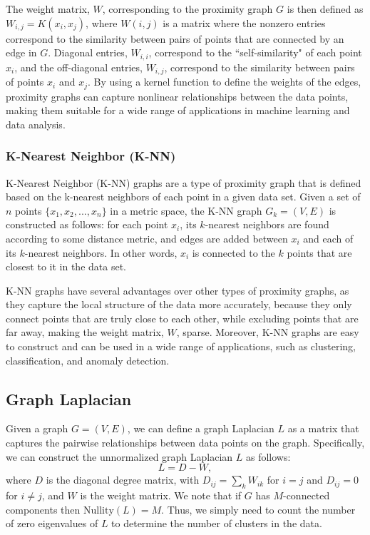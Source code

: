 \documentclass[12pt]{amsart}
\begin{document}
The weight matrix, $W$, corresponding to the proximity graph $G$ is then defined as $W_{i,j} = K(x_i,x_j)$, where $W(i,j)$ is a matrix where the nonzero entries correspond to the similarity between pairs of points that are connected by an edge in $G$. Diagonal entries, $W_{i,i}$, correspond to the ``self-similarity" of each point $x_i$, and the off-diagonal entries, $W_{i,j}$, correspond to the similarity between pairs of points $x_i$ and $x_j$. By using a kernel function to define the weights of the edges, proximity graphs can capture nonlinear relationships between the data points, making them suitable for a wide range of applications in machine learning and data analysis.
\subsubsection{K-Nearest Neighbor (K-NN)}
K-Nearest Neighbor (K-NN) graphs are a type of proximity graph that is defined based on the k-nearest neighbors of each point in a given data set. Given a set of $n$ points $\{x_1, x_2, ..., x_n\}$ in a metric space, the K-NN graph $G_k = (V, E)$ is constructed as follows: for each point $x_i$, its $k$-nearest neighbors are found according to some distance metric, and edges are added between $x_i$ and each of its $k$-nearest neighbors. In other words, $x_i$ is connected to the $k$ points that are closest to it in the data set.

K-NN graphs have several advantages over other types of proximity graphs, as they capture the local structure of the data more accurately, because they only connect points that are truly close to each other, while excluding points that are far away, making the weight matrix, $W$, sparse. Moreover, K-NN graphs are easy to construct and can be used in a wide range of applications, such as clustering, classification, and anomaly detection.

\subsection{Graph Laplacian}
Given a graph $G = (V, E)$, we can define a graph Laplacian $L$ as a matrix that captures the pairwise relationships between data points on the graph. Specifically, we can construct the unnormalized graph Laplacian $L$ as follows:
$$ L = D - W, $$
where $D$ is the diagonal degree matrix, with $D_{ij} = \sum_{k} W_{ik}$ for $i=j$ and $D_{ij} = 0$ for $i\neq j$, and $W$ is the weight matrix. We note that if $G$ has $M$-connected components then $\mathrm{Nullity}(L)=M$. Thus, we simply need to count the number of zero eigenvalues of $L$ to determine the number of clusters in the data.
\end{document}

